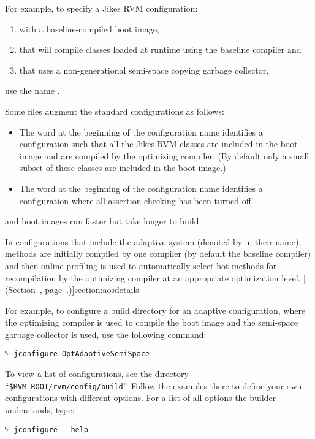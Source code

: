 For example, to specify a Jikes RVM configuration: 
\begin{enumerate}
\item with a baseline-compiled boot image,
\item that will compile classes loaded at runtime using the baseline 
compiler and
\item that uses a non-generational semi-space copying garbage
collector, 
\end{enumerate}
use the name .

Some files augment the standard configurations as follows:
\begin{itemize}
\item The word 
 at the beginning of the configuration name identifies a
configuration such that all the Jikes RVM classes are included in the
boot image and are compiled by the optimizing compiler.  (By default
only a small subset of these classes are included in the boot image.)
\item The word  at the beginning of the configuration name identifies a
 configuration where all assertion checking has been turned off.
\end{itemize}
 and  boot images run faster but take
longer to build.

%
In configurations that include the adaptive system (denoted by
 in their name), methods are initially compiled by one
compiler (by default the baseline compiler) and then online profiling
is used to automatically select hot methods for recompilation by the
optimizing compiler at an appropriate optimization level.  [ (Section~\Ref, page~\Pageref.)]{section:aosdetails}

For example, to configure a build directory for an adaptive
configuration, where the optimizing compiler is used to compile the
boot image and the semi-space garbage collector is used, use the
following command:

\begin{verbatim}
% jconfigure OptAdaptiveSemiSpace
\end{verbatim}

To view a list of configurations, see the directory
``\texttt{\$RVM\_\-ROOT\-/\-rvm\-/\-con\-fig\-/\-build}''.  Follow the
examples there to define your own configurations with different options. 
For a list of all options the builder understands, type:
\begin{verbatim}
% jconfigure --help
\end{verbatim}

